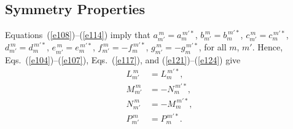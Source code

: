 \documentclass[12pt,prb,aps]{revtex4-1}
\begin{document}
\subsection{Symmetry Properties}
Equations~(\ref{e108})--(\ref{e114}) imply that
$a_{m'}^{\,m}= a_m^{\,m'\ast}$,
$b_{m'}^{\,m}= b_m^{\,m'\ast}$, 
$c_{m'}^{\,m}= c_m^{\,m'\ast}$,
$d_{m'}^{\,m}= d_m^{\,m'\ast}$,
$e_{m'}^{\,m}= e_m^{\,m'\ast}$,
$f_{m'}^{\,m}= -f_m^{\,m'\ast}$,
$g_{m'}^{\,m}= -g_m^{\,m'\ast}$,
for all $m$, $m'$.
 Hence, Eqs.~(\ref{e104})--(\ref{e107}), Eqs.~(\ref{e117}), and (\ref{e121})--(\ref{e124}) give
\begin{align}
L_{m'}^{\,m}&= L_m^{\,m'\ast},\label{e137}\\[0.5ex]
M_{m'}^{\,m}&=-N_m^{\,m'\ast},\\[0.5ex]
N_{m'}^{\,m}&=-M_m^{\,m'\ast},\label{e139}\\[0.5ex]
P_{m'}^{\,m}&= P_m^{\,m'\ast}.\label{e140}
\end{align}
\end{document}
